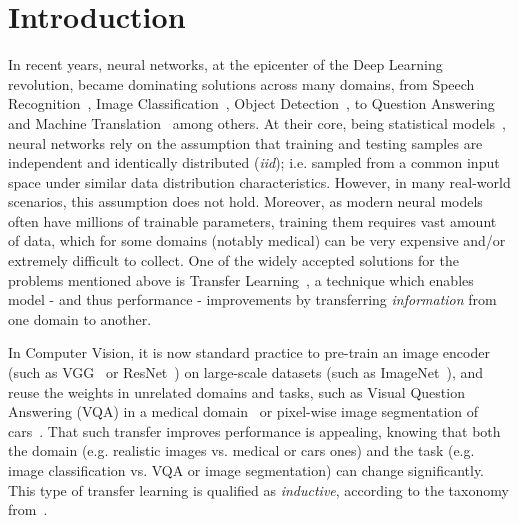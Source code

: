 \section{Introduction}
In recent years, neural networks, at the epicenter of the Deep Learning~\cite{lecun2015deep} revolution, became dominating solutions across many domains, from  Speech Recognition~\cite{graves2013speech}, Image Classification~\cite{krizhevsky2012imagenet}, Object Detection~\cite{redmon2016you}, to Question Answering~\cite{weston2014memory} and Machine Translation~\cite{bahdanau2014neural} among others.
At their core, being statistical models~\cite{ripley1993statistical,warner1996understanding}, neural networks rely on the assumption that training and testing samples are independent and identically distributed (\textit{iid}); i.e. sampled from a common input space under similar data distribution characteristics.
However, in many real-world scenarios, this assumption does not hold. Moreover, as modern neural models often have  millions of trainable parameters, training them requires vast amount of data, which for some domains (notably medical) can be very expensive and/or extremely difficult to collect.
One of the widely accepted solutions for the problems mentioned above is Transfer Learning~\cite{pan2009survey,weiss2016survey}, a technique which enables model - and thus performance - improvements by transferring \emph{information} from one domain to another.


In Computer Vision, it is now standard practice to pre-train an image encoder (such as VGG~\cite{simonyan2014very} or ResNet~\cite{he2016deep}) on large-scale datasets (such as ImageNet~\cite{deng2009imagenet}), and reuse the weights in unrelated domains and tasks, such as Visual Question Answering (VQA) in a medical domain~\cite{kornuta2019leveraging} or pixel-wise image segmentation of cars~\cite{iglovikov2018ternausnet}.
That such transfer improves performance is appealing, knowing that both the domain (e.g. realistic images vs. medical or cars ones) and the task (e.g. image classification vs. VQA or image segmentation) can change significantly. This type of transfer learning is qualified as \emph{inductive}, according to the taxonomy from~\cite{pan2009survey}.

